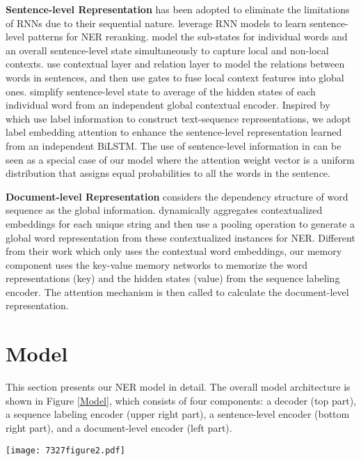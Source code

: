 \documentclass[letterpaper]{article} \usepackage{aaai20}  \usepackage{times}  \usepackage{helvet} \usepackage{courier}  \usepackage[hyphens]{url}  \usepackage{graphicx} \urlstyle{rm} \def\UrlFont{\rm}  \usepackage{graphicx}  \frenchspacing  \setlength{\pdfpagewidth}{8.5in}  \setlength{\pdfpageheight}{11in}
\begin{document}
\noindent\textbf{Sentence-level Representation} 
 has been adopted to eliminate the limitations of RNNs due to their sequential nature. \cite{yang2017neural} leverage RNN models to learn sentence-level patterns for NER reranking.
\cite{zhang2018sentence} model the sub-states for individual
words and an overall sentence-level state simultaneously to
capture local and non-local contexts.
\cite{chen2019grn} use contextual layer and relation layer to model the relations between words in sentences, and then use gates to fuse local context features into global ones.
\cite{liu2019gcdt} simplify sentence-level state to average of the hidden states of each individual word from an independent global contextual encoder.
Inspired by \cite{wang2018joint} which use label information to construct text-sequence representations, we adopt label embedding attention to enhance the sentence-level representation learned from an independent BiLSTM.
The use of sentence-level information in \cite{liu2019gcdt} can be seen as a  special case of our model where the attention weight vector is a uniform distribution that assigns equal probabilities to all the words in the sentence.

\noindent\textbf{Document-level Representation}
\cite{qian2019graphie} considers the dependency structure of word sequence as the global information.
\cite{akbik2019pooled} dynamically aggregates contextualized embeddings for each unique string and then use a pooling operation
to generate a global word representation from these contextualized instances for NER. Different from their work which only uses the contextual word embeddings, our memory component uses the key-value memory networks to memorize the word representations (key) and the  hidden states (value) from the sequence labeling encoder. The attention mechanism is then called to calculate the document-level representation.

\section{Model}
This section presents our NER model in detail. The overall model architecture is shown in Figure \ref{Model}, which consists of four components: a decoder (top part), a sequence labeling encoder (upper right part), a sentence-level encoder (bottom right part), and a document-level encoder (left part). 

\begin{figure*}[!t]
  \centering 
  \texttt{[image: 7327figure2.pdf]}
    \caption{The main architecture of our NER model. The sequence labeling encoder (upper right) generates representations for the decoder and updates the memory component. The sentence-level encoder (bottom right part) generates the sentence-level representation, and the memory network (left part) computes the document-level contextualized information, in which the same color represents the memory slots for the unique word.}\label{Model}
\end{figure*} 
\end{document}
